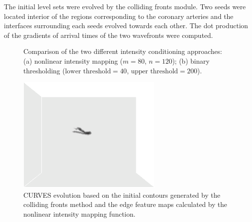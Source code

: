 The initial level sets were evolved by the colliding fronts module.
Two seeds were located interior of the regions corresponding to the coronary arteries and the interfaces surrounding each seeds evolved towards each other.
The dot production of the gradients of arrival times of the two wavefronts were computed.
\begin{figure}[t]
\centering
{}
\hfil
{}
\caption{Comparison of the two different intensity conditioning approaches: (a) nonlinear intensity mapping ($m = 80$, $n = 120$); (b) binary thresholding ($\text{lower threshold} = 40$, $\text{upper threshold} = 200$).}%
\label{fig:IntensityConditioning}
\end{figure}
\begin{figure}[t]
\centering
\includegraphics[width=2.8in]{Figures/chap04/curves.png}
\caption{CURVES evolution based on the initial contours generated by the colliding fronts method and the edge feature maps calculated by the nonlinear intensity mapping function.}%
\label{fig:CURVES}
\end{figure}
